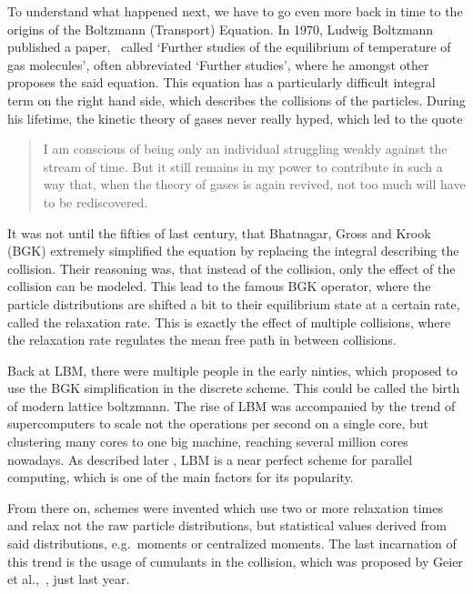 To understand what happened next, we have to go even more back in time to the origins of the Boltzmann (Transport) Equation. In 1970, Ludwig Boltzmann published a paper,~\cite{Boltzmann1970} called `Further studies of the equilibrium of temperature of gas molecules', often abbreviated `Further studies', where he amongst other proposes the said equation. This equation has a particularly difficult integral term on the right hand side, which describes the collisions of the particles. During his lifetime, the kinetic theory of gases never really hyped, which led to the quote
\begin{quote}
I am conscious of being only
an individual struggling weakly
against the stream of time. But
it still remains in my power to
contribute in such a way that,
when the theory of gases is
again revived, not too much
will have to be rediscovered.
\end{quote}
It was not until the fifties of last century, that Bhatnagar, Gross and Krook (BGK) extremely simplified the equation by replacing the integral describing the collision. Their reasoning was, that instead of the collision, only the effect of the collision can be modeled. This lead to the famous BGK operator, where the particle distributions are shifted a bit to their equilibrium state at a certain rate, called the relaxation rate. This is exactly the effect of multiple collisions, where the relaxation rate regulates the mean free path in between collisions.

Back at LBM, there were multiple people in the early ninties, which proposed to use the BGK simplification in the discrete scheme. This could be called the birth of modern lattice boltzmann. The rise of LBM was accompanied by the trend of supercomputers to scale not the operations per second on a single core, but clustering many cores to one big machine, reaching several million cores nowadays. As described later , LBM is a near perfect scheme for parallel computing, which is one of the main factors for its popularity.

From there on, schemes were invented which use two or more relaxation times and relax not the raw particle distributions, but statistical values derived from said distributions, e.g.\ moments or centralized moments. The last incarnation of this trend is the usage of cumulants in the collision, which was proposed by Geier et al.,~\cite{geier2015cumulant}, just last year.
